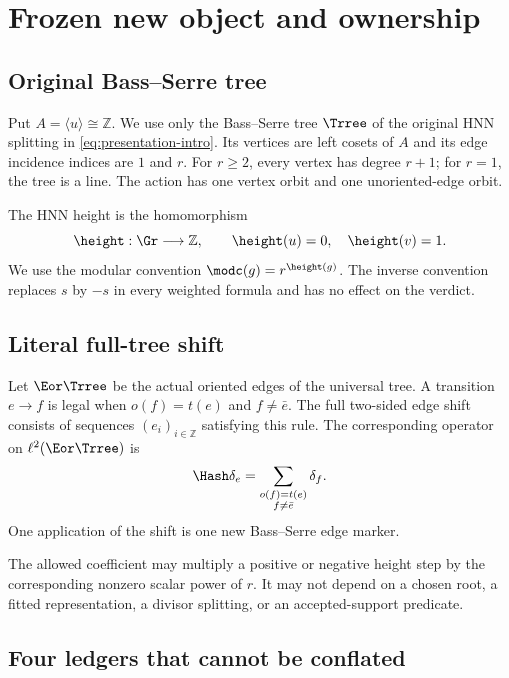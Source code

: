 \section{Frozen new object and ownership}
\label{sec:source-lock}

\subsection{Original Bass--Serre tree}

Put $A=\langle u\rangle\cong\mathbb Z$.  We use only the Bass--Serre tree
$\Trree$ of the original HNN splitting in \eqref{eq:presentation-intro}.  Its
vertices are left cosets of $A$ and its edge incidence indices are $1$ and
$r$.  For $r\ge2$, every vertex has degree $r+1$; for $r=1$, the tree is a
line.  The action has one vertex orbit and one unoriented-edge orbit.

\begin{convention}
\label{conv:height}
The HNN height is the homomorphism
\[
  \height:\Gr\longrightarrow\mathbb Z,
  \qquad \height(u)=0,\quad \height(v)=1.
\]
We use the modular convention $\modc(g)=r^{\height(g)}$.  The inverse
convention replaces $s$ by $-s$ in every weighted formula and has no effect on
the verdict.
\end{convention}

\subsection{Literal full-tree shift}

Let $\Eor\Trree$ be the actual oriented edges of the universal tree.  A
transition $e\to f$ is legal when $o(f)=t(e)$ and $f\ne\bar e$.  The full
two-sided edge shift consists of sequences $(e_i)_{i\in\mathbb Z}$ satisfying
this rule.  The corresponding operator on $\ell^2(\Eor\Trree)$ is
\begin{equation}
  \Hash\delta_e
  =\sum_{\substack{o(f)=t(e)\\f\ne\bar e}}\delta_f.
  \label{eq:hashimoto}
\end{equation}
One application of the shift is one new Bass--Serre edge marker.

The allowed coefficient may multiply a positive or negative height step by
the corresponding nonzero scalar power of $r$.  It may not depend on a chosen
root, a fitted representation, a divisor splitting, or an accepted-support
predicate.

\subsection{Four ledgers that cannot be conflated}

